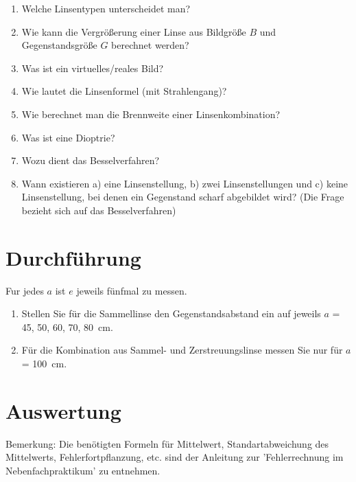 \begin{enumerate} 
%
 \item Welche Linsentypen unterscheidet man?
%
\item Wie kann die Vergrößerung einer Linse aus Bildgröße $B$ und Gegenstandsgröße $G$ berechnet werden?
%
\item Was ist ein virtuelles/reales Bild?
%
\item Wie lautet die Linsenformel (mit Strahlengang)?
%
\item Wie berechnet man die Brennweite einer Linsenkombination?
%
\item Was ist eine Dioptrie?
%
\item Wozu dient das Besselverfahren?
%
\item Wann existieren a) eine Linsenstellung, b) zwei Linsenstellungen und c) keine Linsenstellung, bei denen ein Gegenstand scharf abgebildet wird? (Die Frage bezieht sich auf das Besselverfahren)
\end{enumerate} 

\section{Durchführung} 

 Fur jedes $a$ ist $e$ jeweils fünfmal zu messen.

\begin{enumerate}
 \item Stellen Sie für die Sammellinse den Gegenstandsabstand ein auf jeweils $a$ = 45, 50, 60, 70, 80~cm.
 \item Für die Kombination aus Sammel- und Zerstreuungslinse messen Sie nur für $a$ = 100~cm.
\end{enumerate}

\section{Auswertung} 
Bemerkung: Die benötigten Formeln für Mittelwert, Standartabweichung des Mittelwerts, Fehlerfortpflanzung, etc. sind der Anleitung zur 'Fehlerrechnung im Nebenfachpraktikum' zu entnehmen.

